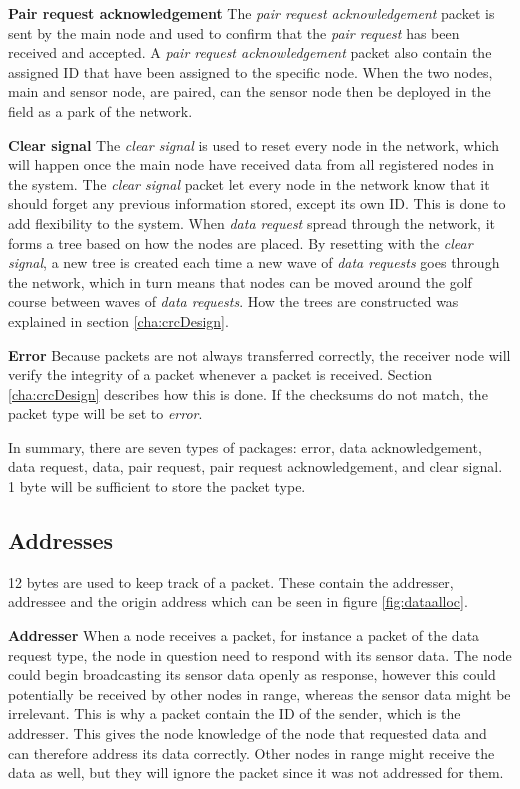 \textbf{Pair request acknowledgement}\newline
The \textit{pair request acknowledgement} packet is sent by the main node and used to confirm that the \textit{pair request} has been received and accepted. A \textit{pair request acknowledgement} packet also contain the assigned ID that have been assigned to the specific node. When the two nodes, main and sensor node, are paired, can the sensor node then be deployed in the field as a park of the network. 

\textbf{Clear signal}\newline
The \textit{clear signal} is used to reset every node in the network, which will happen once the main node have received data from all registered nodes in the system.
The \textit{clear signal} packet let every node in the network know that it should forget any previous information stored, except its own ID. This is done to add flexibility to the system. When \textit{data request} spread through the network, it forms a tree based on how the nodes are placed. By resetting with the \textit{clear signal}, a new tree is created each time a new wave of \textit{data requests} goes through the network, which in turn means that nodes can be moved around the golf course between waves of \textit{data requests}. How the trees are constructed was explained in section \ref{cha:crcDesign}.

\textbf{Error}\newline
Because packets are not always transferred correctly, the receiver node will verify the integrity of a packet whenever a packet is received. Section \ref{cha:crcDesign} describes how this is done. If the checksums do not match, the packet type will be set to \textit{error}.

In summary, there are seven types of packages: error, data acknowledgement, data request, data, pair request, pair request acknowledgement, and clear signal. 1 byte will be sufficient to store the packet type.



\subsection{Addresses}
12 bytes are used to keep track of a packet. These contain the addresser, addressee and the origin address which can be seen in figure \ref{fig:dataalloc}. 

\textbf{Addresser}\newline
When a node receives a packet, for instance a packet of the data request type, the node in question need to respond with its sensor data. The node could begin broadcasting its sensor data openly as response, however this could potentially be received by other nodes in range, whereas the sensor data might be irrelevant. This is why a packet contain the ID of the sender, which is the addresser. This gives the node knowledge of the node that requested data and can therefore address its data correctly. Other nodes in range might receive the data as well, but they will ignore the packet since it was not addressed for them.

